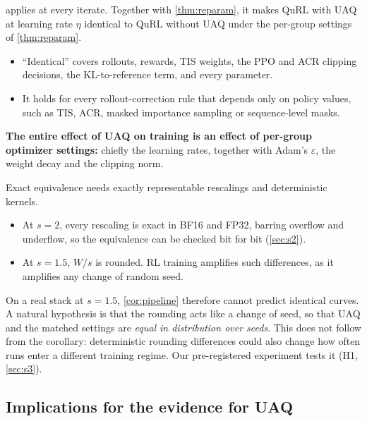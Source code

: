 \begin{corollary}\label{cor:pipeline}
 applies at every iterate. Together with \cref{thm:reparam}, it makes QuRL with UAQ at learning rate $\eta$ identical to QuRL without UAQ under the per-group settings of \cref{thm:reparam}.
\begin{itemize}[leftmargin=*,itemsep=1pt]
\item ``Identical'' covers rollouts, rewards, TIS weights, the PPO and ACR clipping decisions, the KL-to-reference term, and every parameter.
\item It holds for every rollout-correction rule that depends only on policy values, such as TIS, ACR, masked importance sampling or sequence-level masks.
\end{itemize}
\textbf{The entire effect of UAQ on training is an effect of per-group optimizer settings:} chiefly the learning rates, together with Adam's $\varepsilon$, the weight decay and the clipping norm.
\end{corollary}

\begin{remark}\label{rem:practice}
Exact equivalence needs exactly representable rescalings and deterministic kernels.
\begin{itemize}[leftmargin=*,itemsep=1pt]
\item At $s=2$, every rescaling is exact in BF16 and FP32, barring overflow and underflow, so the equivalence can be checked bit for bit (\cref{sec:s2}).
\item At $s=1.5$, $W/s$ is rounded. RL training amplifies such differences, as it amplifies any change of random seed.
\end{itemize}
On a real stack at $s=1.5$, \cref{cor:pipeline} therefore cannot predict identical curves. A natural hypothesis is that the rounding acts like a change of seed, so that UAQ and the matched settings are \emph{equal in distribution over seeds}. This does not follow from the corollary: deterministic rounding differences could also change how often runs enter a different training regime. Our pre-registered experiment tests it (H1, \cref{sec:s3}).
\end{remark}

\subsection{Implications for the evidence for UAQ}\label{sec:evidence}

